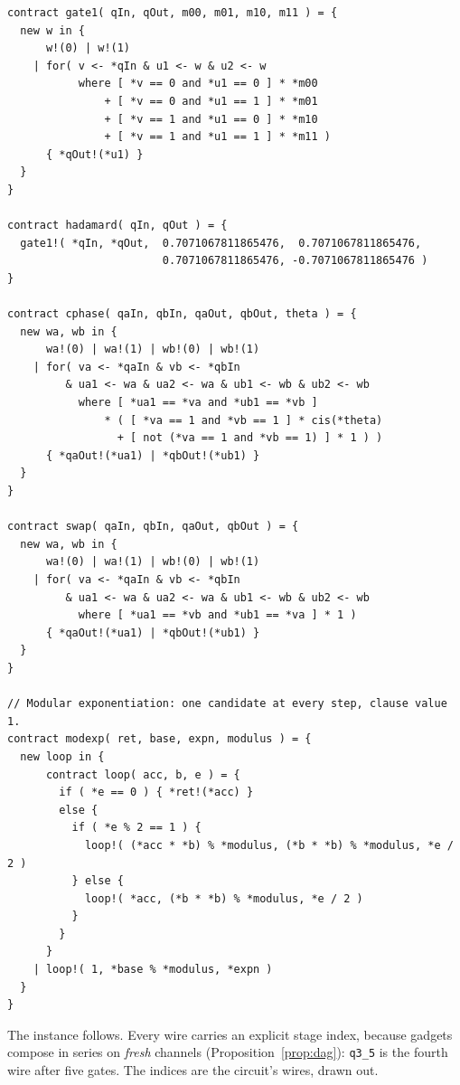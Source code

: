 \documentclass[11pt,a4paper]{article}
\theoremstyle{plain}
\theoremstyle{definition}
\theoremstyle{remark}
\begin{document}
\begin{lstlisting}
contract gate1( qIn, qOut, m00, m01, m10, m11 ) = {
  new w in {
      w!(0) | w!(1)
    | for( v <- *qIn & u1 <- w & u2 <- w
           where [ *v == 0 and *u1 == 0 ] * *m00
               + [ *v == 0 and *u1 == 1 ] * *m01
               + [ *v == 1 and *u1 == 0 ] * *m10
               + [ *v == 1 and *u1 == 1 ] * *m11 )
      { *qOut!(*u1) }
  }
}

contract hadamard( qIn, qOut ) = {
  gate1!( *qIn, *qOut,  0.7071067811865476,  0.7071067811865476,
                        0.7071067811865476, -0.7071067811865476 )
}

contract cphase( qaIn, qbIn, qaOut, qbOut, theta ) = {
  new wa, wb in {
      wa!(0) | wa!(1) | wb!(0) | wb!(1)
    | for( va <- *qaIn & vb <- *qbIn
         & ua1 <- wa & ua2 <- wa & ub1 <- wb & ub2 <- wb
           where [ *ua1 == *va and *ub1 == *vb ]
               * ( [ *va == 1 and *vb == 1 ] * cis(*theta)
                 + [ not (*va == 1 and *vb == 1) ] * 1 ) )
      { *qaOut!(*ua1) | *qbOut!(*ub1) }
  }
}

contract swap( qaIn, qbIn, qaOut, qbOut ) = {
  new wa, wb in {
      wa!(0) | wa!(1) | wb!(0) | wb!(1)
    | for( va <- *qaIn & vb <- *qbIn
         & ua1 <- wa & ua2 <- wa & ub1 <- wb & ub2 <- wb
           where [ *ua1 == *vb and *ub1 == *va ] * 1 )
      { *qaOut!(*ua1) | *qbOut!(*ub1) }
  }
}

// Modular exponentiation: one candidate at every step, clause value 1.
contract modexp( ret, base, expn, modulus ) = {
  new loop in {
      contract loop( acc, b, e ) = {
        if ( *e == 0 ) { *ret!(*acc) }
        else {
          if ( *e % 2 == 1 ) {
            loop!( (*acc * *b) % *modulus, (*b * *b) % *modulus, *e / 2 )
          } else {
            loop!( *acc, (*b * *b) % *modulus, *e / 2 )
          }
        }
      }
    | loop!( 1, *base % *modulus, *expn )
  }
}
\end{lstlisting}

The instance follows. Every wire carries an explicit stage index, because
gadgets compose in series on \emph{fresh} channels
(Proposition~\ref{prop:dag}): \texttt{q3\_5} is the fourth wire after five
gates. The indices are the circuit's wires, drawn out.
\end{document}
